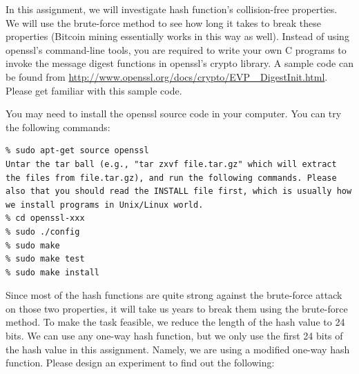 \documentclass[11pt]{article}
\begin{document}
In this assignment, we will investigate hash function's collision-free properties. We will use the brute-force
method to see how long it takes to break these properties (Bitcoin mining essentially works in this way as well). Instead of using openssl's command-line tools, you are required to write your own C programs to invoke the message digest functions in openssl's crypto library. A sample code can be found from \url{http://www.openssl.org/docs/crypto/EVP_
DigestInit.html}. Please get familiar with this sample code.

You may need to install the openssl source code in your computer. You can try the following commands:
\begin{lstlisting}
% sudo apt-get source openssl
Untar the tar ball (e.g., "tar zxvf file.tar.gz" which will extract the files from file.tar.gz), and run the following commands. Please also that you should read the INSTALL file first, which is usually how we install programs in Unix/Linux world.
% cd openssl-xxx
% sudo ./config
% sudo make
% sudo make test
% sudo make install
\end{lstlisting}


Since most of the hash functions are quite strong against the brute-force attack on those two properties,
it will take us years to break them using the brute-force method. To make the task feasible, we reduce the
length of the hash value to 24 bits. We can use any one-way hash function, but we only use the first 24 bits
of the hash value in this assignment. Namely, we are using a modified one-way hash function. Please design an
experiment to find out the following:




\end{document}
